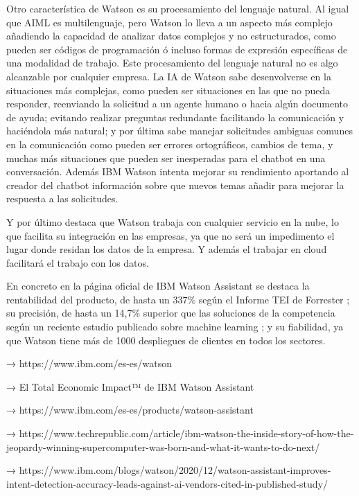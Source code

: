 Otro característica de Watson es su procesamiento del lenguaje natural. Al igual que AIML es multilenguaje, pero Watson lo lleva a un aspecto más complejo añadiendo la capacidad de analizar datos complejos y no estructurados, como pueden ser códigos de programación ó incluso formas de expresión específicas de una modalidad de trabajo. Este procesamiento del lenguaje natural no es algo alcanzable por cualquier empresa. La IA de Watson sabe desenvolverse en la situaciones más complejas, como pueden ser situaciones en las que no pueda responder, reenviando la solicitud a un agente humano o hacia algún documento de ayuda; evitando realizar preguntas redundante facilitando la comunicación y haciéndola más natural; y por última sabe manejar solicitudes ambiguas comunes en la comunicación como pueden ser errores ortográficos, cambios de tema, y muchas más situaciones que pueden ser inesperadas para el chatbot en una conversación. Además IBM Watson intenta mejorar su rendimiento aportando al creador del chatbot información sobre que nuevos temas añadir para mejorar la respuesta a las solicitudes.

Y por último destaca que Watson trabaja con cualquier servicio en la nube, lo que facilita su integración en las empresas, ya que no será un impedimento el lugar donde residan los datos de la empresa. Y además el trabajar en cloud facilitará el trabajo con los datos.

En concreto en la página oficial de IBM Watson Assistant \cite{RefWorks:RefID:17-ibm} se destaca la rentabilidad del producto, de hasta un 337\% según el Informe TEI de Forrester \cite{RefWorks:RefID:8-iles2020el}; su precisión, de hasta un 14,7\% superior que las soluciones de la competencia según un reciente estudio publicado sobre machine learning \cite{RefWorks:RefID:18-2020watson}; y su fiabilidad, ya que Watson tiene más de 1000 despliegues de clientes en todos los sectores.



→ https://www.ibm.com/es-es/watson

→ El Total Economic Impact™ de IBM Watson Assistant

→ https://www.ibm.com/es-es/products/watson-assistant

→ https://www.techrepublic.com/article/ibm-watson-the-inside-story-of-how-the-jeopardy-winning-supercomputer-was-born-and-what-it-wants-to-do-next/

→ https://www.ibm.com/blogs/watson/2020/12/watson-assistant-improves-intent-detection-accuracy-leads-against-ai-vendors-cited-in-published-study/


